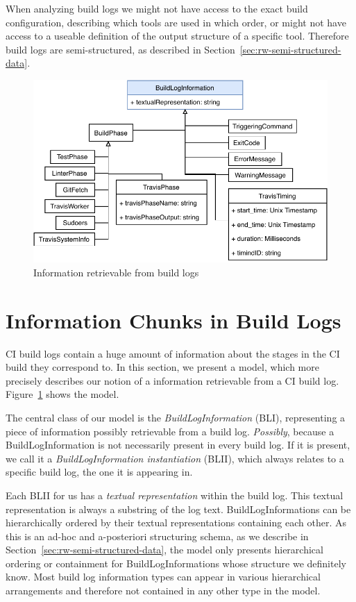 \documentclass[\myrootdir/main.tex]{subfiles}
\begin{document}
When analyzing build logs we might not have access to the exact build configuration, describing which tools are used in which order, or might not have access to a useable definition of the output structure of a specific tool.
Therefore build logs are semi-structured, as described in Section~\ref{sec:rw-semi-structured-data}.


\begin{figure}[htbp]
	\centering
	\includegraphics[width=\textwidth, clip]{img/build-log-information.pdf}
	\caption{Information retrievable from build logs}
	\label{fig:build-log-information}
\end{figure}

\section{Information Chunks in Build Logs}
\label{sec:bli}
CI build logs contain a huge amount of information about the stages in the CI build they correspond to.
In this section, we present a model, which more precisely describes our notion of a information retrievable from a CI build log.
Figure~\ref{fig:build-log-information} shows the model.

The central class of our model is the \emph{BuildLogInformation} (BLI), representing a piece of information possibly retrievable from a build log.
\emph{Possibly}, because a BuildLogInformation is not necessarily present in every build log.
If it is present, we call it a \emph{BuildLogInformation instantiation} (BLII), which always relates to a specific build log, the one it is appearing in.

Each BLII for us has a \emph{textual representation} within the build log.
This textual representation is always a substring of the log text.
BuildLogInformations can be hierarchically ordered by their textual representations containing each other.
As this is an ad-hoc and a-posteriori structuring schema, as we describe in Section~\ref{sec:rw-semi-structured-data}, the model only presents hierarchical ordering or containment for BuildLogInformations whose structure we definitely know.
Most build log information types can appear in various hierarchical arrangements and therefore not contained in any other type in the model.
\end{document}
